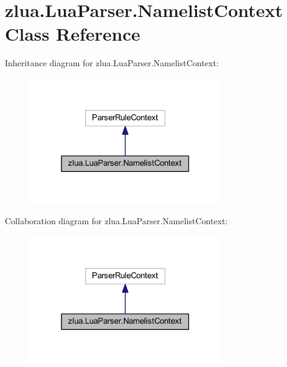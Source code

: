\hypertarget{classzlua_1_1_lua_parser_1_1_namelist_context}{}\section{zlua.\+Lua\+Parser.\+Namelist\+Context Class Reference}
\label{classzlua_1_1_lua_parser_1_1_namelist_context}


Inheritance diagram for zlua.\+Lua\+Parser.\+Namelist\+Context\+:
\nopagebreak
\begin{figure}[H]
\begin{center}
\leavevmode
\includegraphics[width=237pt]{classzlua_1_1_lua_parser_1_1_namelist_context__inherit__graph}
\end{center}
\end{figure}


Collaboration diagram for zlua.\+Lua\+Parser.\+Namelist\+Context\+:
\nopagebreak
\begin{figure}[H]
\begin{center}
\leavevmode
\includegraphics[width=237pt]{classzlua_1_1_lua_parser_1_1_namelist_context__coll__graph}
\end{center}
\end{figure}
